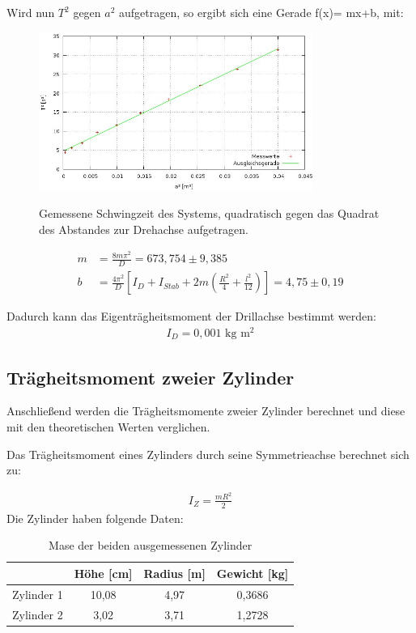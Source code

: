 Wird nun $T^2$ gegen $a^2$ aufgetragen, so ergibt sich eine Gerade f(x)= mx+b, mit:
\begin{figure}[htbp]
\includegraphics[width=0.8\textwidth]{pics/eigentr.jpg}
\label{pic_plot}
\caption{Gemessene Schwingzeit des Systems, quadratisch gegen das Quadrat des Abstandes zur Drehachse aufgetragen.}

\end{figure}
\begin{align*}
 m&=\frac{8m\pi^2}{D}=673,754 \pm 9,385\\
b&=\frac{4\pi^2}{D}  \left[  I_D+I_{Stab}+2m\left(\frac{R^2}{4}+\frac{l^2}{12}\right)\right]=4,75 \pm 0,19
\end{align*}

Dadurch kann das Eigenträgheitsmoment der Drillachse bestimmt werden:
\begin{align*}
I_D=0,001 \text{ kg m$^2$}
\end{align*}

\subsection{Trägheitsmoment zweier Zylinder}
Anschließend werden die Trägheitsmomente zweier Zylinder berechnet und diese mit den theoretischen Werten verglichen.

Das Trägheitsmoment eines Zylinders durch seine Symmetrieachse berechnet sich zu:

\begin{align}
I_{Z}=\frac{mR^2}{2}
\label{eq_Izyl}
\end{align}
\newpage
Die Zylinder haben folgende Daten:
\begin{table}[H]
\begin{tabular}{|c|c|c|c|}
\hline 
 & Höhe [cm] & Radius [m] & Gewicht [kg]\\ 
\hline 
Zylinder 1 & 10,08 & 4,97 & 0,3686 \\ 
\hline 
Zylinder 2 & 3,02 & 3,71 & 1,2728 \\ 
\hline 
\end{tabular} 
\caption{Mase der beiden ausgemessenen Zylinder}
\end{table}

